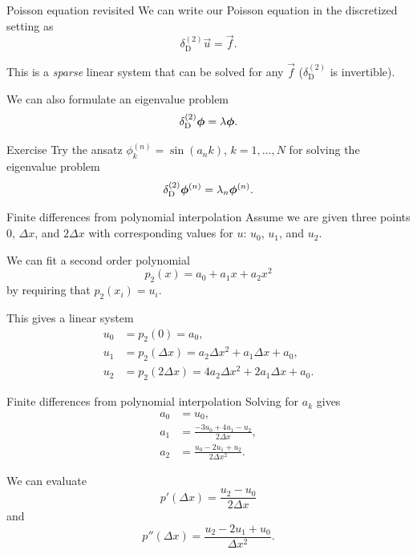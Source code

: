 \begin{frame}{Poisson equation revisited}
	We can write our Poisson equation in the discretized setting as 
	\[ \delta^{(2)}_{\text{D}} \vec{u} = \vec{f}. \]
	
	This is a \emph{sparse} linear system that can be solved for any $ \vec{f} $ ($ \delta^{(2)}_{\text{D}} $ is invertible). 
	
	We can also formulate an eigenvalue problem 
	\[ \delta^{(2)}_{\text{D}} \bm{\phi}  = \lambda \bm{\phi}. \]
\end{frame}


\begin{frame}{Exercise \exercisen}
	Try the ansatz $ \phi_k^{(n)} = \sin(a_n k) $, $ k=1,...,N $ for solving the eigenvalue problem 
	\[ \delta^{(2)}_{\text{D}} \bm{\phi}^{(n)}  = \lambda_n \bm{\phi}^{(n)}. \]
	
\end{frame}


\begin{frame}{Finite differences from polynomial interpolation}
	Assume we are given three points $ 0 $, $ \Delta x $, and $ 2 \Delta x $ with corresponding values for $ u $: $ u_0 $, $ u_1 $, and $ u_2 $. 
	
	We can fit a second order polynomial 
	\[ p_2(x) = a_0 + a_1 x + a_2 x^2 \]
	by requiring that $ p_2(x_i) = u_i $. 
	
	\pause
	This gives a linear system 
	\begin{align*}
		u_{0}	&= p_2(0) = a_{0}, \\
		u_{1}	&= p_2(\Delta x) = a_{2}\Delta x^{2} + a_{1}\Delta x + a_{0}, \\
		u_{2}	&= p_2(2 \Delta x)=4a_{2}\Delta x^{2} + 2a_{1}\Delta x + a_{0}.
	\end{align*}
\end{frame}

\begin{frame}{Finite differences from polynomial interpolation}
	Solving for $ a_k $ gives 
	\begin{align*}
		a_{0}	&= u_{0}, \\
		a_{1}	&=\frac{-3 u_0 + 4 u_1 - u_2}{2 \Delta x}, \\
		a_{2}	&= \frac{u_0 - 2 u_1 + u_2}{2 \Delta x^2}.
	\end{align*}
	
	\pause
	We can evaluate 
	\[ p'(\Delta x) = \frac{u_2 - u_0}{2 \Delta x} \]
	and 
	\[ p''(\Delta x) = \frac{u_2 - 2 u_1 + u_0}{\Delta x^2}. \]
\end{frame}

